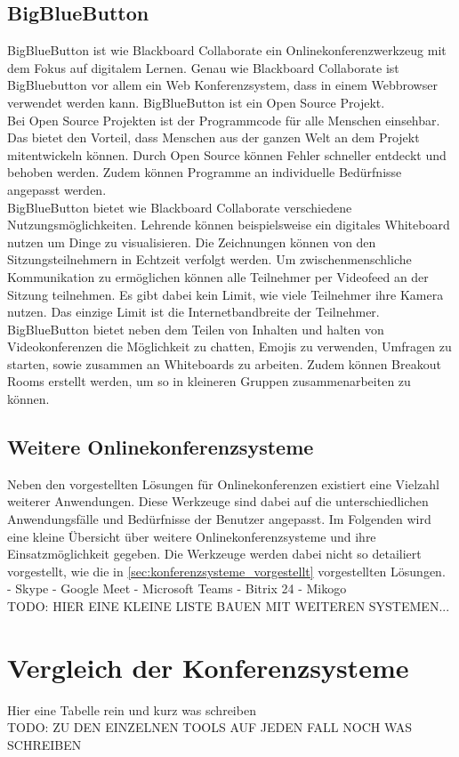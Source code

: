 \subsection{BigBlueButton}
BigBlueButton ist wie Blackboard Collaborate ein Onlinekonferenzwerkzeug mit dem Fokus auf digitalem Lernen.
Genau wie Blackboard Collaborate ist BigBluebutton vor allem ein Web Konferenzsystem, dass in einem Webbrowser verwendet werden kann.
BigBlueButton ist ein Open Source Projekt.
\autocite[Vgl.][]{M_BigBlueButton.o.J.b}
\\
Bei Open Source Projekten ist der Programmcode für alle Menschen einsehbar.
Das bietet den Vorteil, dass Menschen aus der ganzen Welt an dem Projekt mitentwickeln können.
Durch Open Source können Fehler schneller entdeckt und behoben werden.
Zudem können Programme an individuelle Bedürfnisse angepasst werden.
\autocite[Vgl.][]{M_RedHat.o.J.}
\\
BigBlueButton bietet wie Blackboard Collaborate verschiedene Nutzungsmöglichkeiten.
Lehrende können beispielsweise ein digitales Whiteboard nutzen um Dinge zu visualisieren.
Die Zeichnungen können von den Sitzungsteilnehmern in Echtzeit verfolgt werden.
Um zwischenmenschliche Kommunikation zu ermöglichen können alle Teilnehmer per Videofeed an der Sitzung teilnehmen.
Es gibt dabei kein Limit, wie viele Teilnehmer ihre Kamera nutzen. Das einzige Limit ist die Internetbandbreite der Teilnehmer.
\autocite[Vgl.][]{M_BigBlueButton.o.J.}
\\
BigBlueButton bietet neben dem Teilen von Inhalten und halten von Videokonferenzen die Möglichkeit zu chatten, Emojis zu verwenden, Umfragen zu starten, sowie zusammen an Whiteboards zu arbeiten.
Zudem können Breakout Rooms erstellt werden, um so in kleineren Gruppen zusammenarbeiten zu können.
\autocite[Vgl.][]{M_BigBlueButton.o.J.}
\\

\subsection{Weitere Onlinekonferenzsysteme}
Neben den vorgestellten Lösungen für Onlinekonferenzen existiert eine Vielzahl weiterer Anwendungen.
Diese Werkzeuge sind dabei auf die unterschiedlichen Anwendungsfälle und Bedürfnisse der Benutzer angepasst.
Im Folgenden wird eine kleine Übersicht über weitere Onlinekonferenzsysteme und ihre Einsatzmöglichkeit gegeben.
Die Werkzeuge werden dabei nicht so detailiert vorgestellt, wie die in \autoref{sec:konferenzsysteme_vorgestellt} vorgestellten Lösungen.
\\
- Skype
- Google Meet
- Microsoft Teams
- Bitrix 24
- Mikogo
\autocite[Vgl.][]{M_Straub.o.J.}
\\

TODO: HIER EINE KLEINE LISTE BAUEN MIT WEITEREN SYSTEMEN...

\section{Vergleich der Konferenzsysteme}
Hier eine Tabelle rein und kurz was schreiben\\
TODO: ZU DEN EINZELNEN TOOLS AUF JEDEN FALL NOCH WAS SCHREIBEN
